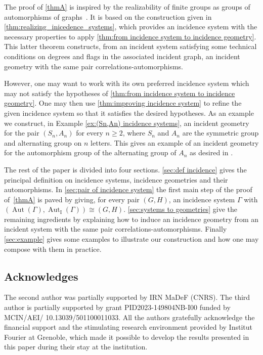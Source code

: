 \documentclass{amsart}
\theoremstyle{definition}
\theoremstyle{remark}
\newcommand{\Aut}{\operatorname{Aut}}
\newcommand{\AutI}{\Aut_{\text{I}}}
\begin{document}
The proof of \autoref{thmA} is inspired by the realizability of finite groups as groups of automorphisms of graphs~\cite{Fr39}. It is based on the construction given in \autoref{thm:realizing_inicedence_systems}, which provides an incidence system with the necessary properties to apply \autoref{thm:from incidence system to incidence geometry}. This latter theorem constructs, from an incident system satisfying some technical conditions on degrees and flags in the associated incident graph, an incident geometry with the same pair correlations-automorphisms. 

However, one may want to work with its own preferred incidence system which may not satisfy the hypotheses of \autoref{thm:from incidence system to incidence geometry}. One may then use \autoref{thm:improving incidence system} to refine the given incidence system so that it satisfies the desired hypotheses. As an example we construct, in Example \ref{ex:(Sn,An) incidence systems}, an incident geometry for the pair $(S_n,A_n)$ for every $n\geq 2$, where $S_n$ and $A_n$ are the symmetric group and alternating group on $n$ letters. This gives an example of an incident geometry for the automorphism group of the alternating group of $A_n$ as desired in \cite{LST2025}. 

The rest of the paper is divided into four sections. \autoref{sec:def incidence} gives the principal definition on incidence systems, incidence geometries and their automorphisms. In \autoref{sec:pair of incidence system} the first main step of the proof of~\autoref{thmA} is paved by giving, for every pair $(G,H)$, an incidence system $\Gamma$ with $(\Aut(\Gamma),\AutI(\Gamma))\cong (G,H)$. \autoref{sec:systems to geometries} give the remaining ingredients by explaining how to induce an incidence geometry from an incident system with the same pair correlations-automorphisms. Finally \autoref{sec:example} gives some examples to illustrate our construction and how one may compose with them in practice. 

\subsection*{Acknowledges}
The second author was partially supported by IRN MaDeF (CNRS). The third author is partially supported by grant PID2023-149804NB-I00 funded by MCIN/AEI/
10.13039/501100011033. All the authors gratefully acknowledge the financial support and the stimulating research environment provided by Institut Fourier at Grenoble, which made it possible to develop the results presented in this paper during their stay at the institution.
\end{document}
